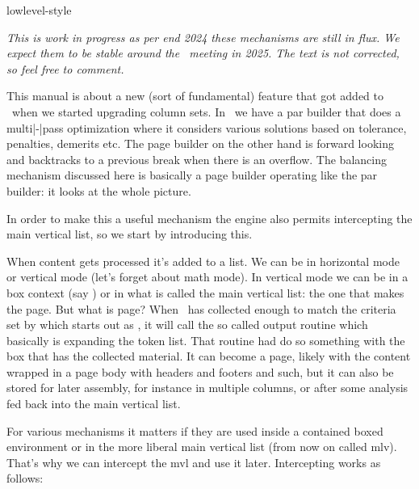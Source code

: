 
\environment lowlevel-style

\startdocument
  [title=balancing,
   color=middlecyan]

\startsectionlevel[title=Introduction]

{\em This is work in progress as per end 2024 these mechanisms are still in flux.
We expect them to be stable around the \CONTEXT\ meeting in 2025. The text is not
corrected, so feel free to comment.}

This manual is about a new (sort of fundamental) feature that got added to
\LUAMETATEX\ when we started upgrading column sets. In \TEX\ we have a par
builder that does a multi|-|pass optimization where it considers various
solutions based on tolerance, penalties, demerits etc. The page builder on the
other hand is forward looking and backtracks to a previous break when there is an
overflow. The balancing mechanism discussed here is basically a page builder
operating like the par builder: it looks at the whole picture.

In order to make this a useful mechanism the engine also permits intercepting the
main vertical list, so we start by introducing this.

\stopsectionlevel

\startsectionlevel[title=Intercepting the MVL]

When content gets processed it's added to a list. We can be in horizontal mode or
vertical mode (let's forget about math mode). In vertical mode we can be in a box
context (say \type {\vbox}) or in what is called the main vertical list: the one
that makes the page. But what is page? When \TEX\ has collected enough to match
the criteria set by \type {\pagegoal} which starts out as \type {\vsize}, it will
call the so called output routine which basically is expanding the \type
{\output} token list. That routine had do so something with the box that has the
collected material. It can become a page, likely with the content wrapped in a
page body with headers and footers and such, but it can also be stored for later
assembly, for instance in multiple columns, or after some analysis fed back into
the main vertical list.

For various mechanisms it matters if they are used inside a contained boxed
environment or in the more liberal main vertical list (from now on called mlv).
That's why we can intercept the mvl and use it later. Intercepting works as
follows:

